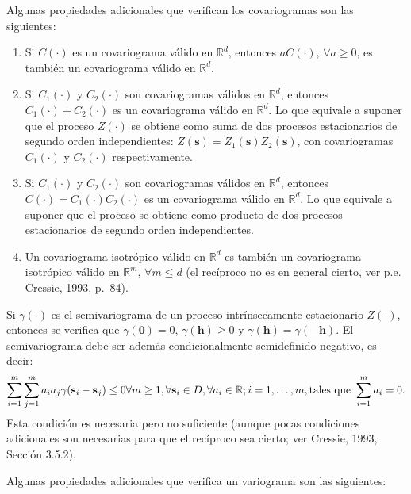 \documentclass[
  spanish,
]{book}
\theoremstyle{break}
\theoremstyle{definition}
\theoremstyle{definition}
\theoremstyle{definition}
\theoremstyle{definition}
\theoremstyle{remark}
\begin{document}
Algunas propiedades adicionales que verifican los covariogramas son las siguientes:

\begin{enumerate}
\def\labelenumi{\arabic{enumi}.}
\item
  Si \(C(\cdot)\) es un covariograma válido en \(\mathbb{R}^d\), entonces \(aC(\cdot)\), \(\forall a\geq 0\), es
  también un covariograma válido en \(\mathbb{R}^d\).
\item
  Si \(C_1 (\cdot)\) y \(C_2 (\cdot)\) son covariogramas válidos en \(\mathbb{R}^d\), entonces \(C_1 (\cdot) + C_2 (\cdot)\) es un
  covariograma válido en \(\mathbb{R}^d\). Lo que equivale a suponer que el proceso \(Z(\cdot)\) se obtiene como suma de dos procesos estacionarios de segundo orden independientes: \(Z(\mathbf{s})=Z_1 (\mathbf{s})Z_2 (\mathbf{s})\), con covariogramas \(C_1 (\cdot)\) y \(C_2 (\cdot)\) respectivamente.
\item
  Si \(C_1 (\cdot)\) y \(C_2 (\cdot)\) son covariogramas válidos en \(\mathbb{R}^d\), entonces \(C(\cdot) = C_1 (\cdot)C_2 (\cdot)\)
  es un covariograma válido en \(\mathbb{R}^d\). Lo que equivale a suponer que el proceso se obtiene como producto de dos procesos estacionarios de segundo orden independientes.
\item
  Un covariograma isotrópico válido en \(\mathbb{R}^d\) es también un covariograma isotrópico válido en \(\mathbb{R}^m\), \(\forall m\leq d\) (el recíproco no es en general cierto, ver p.e. Cressie, 1993, p.~84).
\end{enumerate}

Si \(\gamma (\cdot)\) es el semivariograma de un proceso intrínsecamente estacionario \(Z(\cdot)\), entonces se verifica que \(\gamma (\mathbf{0})=0\), \(\gamma (\mathbf{h})\geq 0\) y \(\gamma (\mathbf{h})=\gamma (-\mathbf{h})\).
El semivariograma debe ser además condicionalmente semidefinido negativo, es decir:
\[\sum\limits_{i=1}^{m}\sum\limits_{j=1}^{m}a_i a_j \gamma(\mathbf{s}_i -\mathbf{s}_j) \leq 0  \\
\forall m\geq 1,\forall \mathbf{s}_i \in D,\forall a_i \in \mathbb{R};i=1, \ldots,m,\text{tales que } \sum\limits_{i=1}^{m}a_i = 0.\]
Esta condición es necesaria pero no suficiente (aunque pocas condiciones adicionales son necesarias para que el recíproco sea cierto; ver Cressie, 1993, Sección 3.5.2).

Algunas propiedades adicionales que verifica un variograma son las siguientes:
\end{document}

